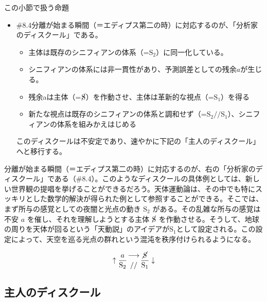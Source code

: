 \begin{note}{この小節で扱う命題}
  \begin{itemize}
    \tightlist
    \item{\#8.4}分離が始まる瞬間（＝エディプス第二の時）に対応するのが、「分析家のディスクール」である。
      \begin{itemize}
        \tightlist
        \item 主体は既存のシニフィアンの体系（=$\textrm{S}_2$）に同一化している。
        \item シニフィアンの体系には非一貫性があり、予測誤差としての残余$a$が生じる。
        \item 残余aは主体（=$\cancel{\textrm{S}}$）を作動させ、主体は革新的な視点（=$\textrm{S}_1$）を得る
        \item 新たな視点は既存のシニフィアンの体系と調和せず（=$\textrm{S}_2//\textrm{S}_1$）、シニフィアンの体系を組みかえはじめる
      \end{itemize}このディスクールは不安定であり、速やかに下記の「主人のディスクール」へと移行する。
  \end{itemize}
\end{note}

分離が始まる瞬間（＝エディプス第二の時）に対応するのが、右の「分析家のディスクール」である（\#8.4）。このようなディスクールの具体例としては、新しい世界観の提唱を挙げることができるだろう。天体運動論は、その中でも特にスッキリとした数学的解決が得られた例として参照することができる。そこでは、まず所与の感覚としての夜闇と光点の動き
\(\textrm{S}_2\) がある。その乱雑な所与の感覚は不安 \(a\)
を催し、それを理解しようとする主体 \(\cancel{\textrm{S}}\)
を作動させる。そうして、地球の周りを天体が回るという「天動説」のアイデアが\(\textrm{S}_1\)として設定される。この設定によって、天空を巡る光点の群れという混沌を秩序付けられるようになる。

\[
\uparrow\frac{a}{\mathrm{S_2}}\genfrac{}{}{0pt}{}{\longrightarrow}{//}\frac{\mathrm{\cancel{S}}}{\mathrm{S_1}}\downarrow
\]

\subsection{主人のディスクール}\label{ux4e3bux4ebaux306eux30c7ux30a3ux30b9ux30afux30fcux30eb}

